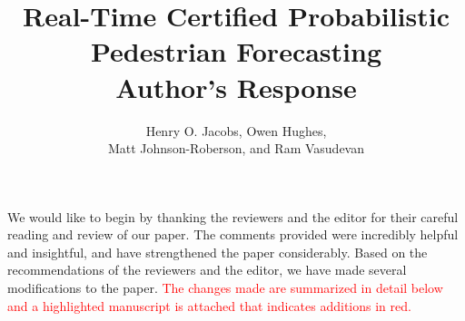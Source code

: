 \documentclass[usenames,dvipsnames]{article}
\title{\LARGE Real-Time Certified Probabilistic Pedestrian Forecasting \\ \textbf{Author's Response} }
\author{Henry O. Jacobs, Owen Hughes, \\ Matt Johnson-Roberson, and Ram Vasudevan }
\newcommand{\todo}[1]{\textcolor{red}{#1}}
\begin{document}
\maketitle


We would like to begin by thanking the reviewers and the editor for their careful reading and review of our paper.
The comments provided were incredibly helpful and insightful, and have strengthened the paper considerably.
Based on the recommendations of the reviewers and the editor, we have made several modifications to the paper.
\todo{The changes made are summarized in detail below and a highlighted manuscript is attached that indicates additions in red.}	
\end{document}
